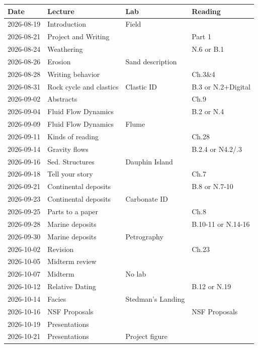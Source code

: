 \documentclass[11pt,]{article}
\begin{document}
\newpage

\begin{table}[!h]
\centering
\begin{tabular}{l>{\raggedright\arraybackslash}p{4cm}>{\raggedright\arraybackslash}p{4cm}>{\raggedright\arraybackslash}p{4cm}}
\toprule
Date & Lecture & Lab & Reading\\
\midrule
2026-08-19 & Introduction & Field & \\
2026-08-21 & Project and Writing &  & Part 1\\
2026-08-24 & Weathering &  & N.6 or B.1\\
2026-08-26 & Erosion & Sand description & \\
2026-08-28 & Writing behavior &  & Ch.3\&4\\
2026-08-31 & Rock cycle and clastics & Clastic ID & B.3 or N.2+Digital\\
2026-09-02 & Abstracts &  & Ch.9\\
2026-09-04 & Fluid Flow Dynamics &  & B.2 or N.4\\
2026-09-09 & Fluid Flow Dynamics & Flume & \\
2026-09-11 & Kinds of reading &  & Ch.28\\
2026-09-14 & Gravity flows &  & B.2.4 or N4.2/.3\\
2026-09-16 & Sed. Structures & Dauphin Island & \\
2026-09-18 & Tell your story &  & Ch.7\\
2026-09-21 & Continental deposits &  & B.8 or N.7-10\\
2026-09-23 & Continental deposits & Carbonate ID & \\
2026-09-25 & Parts to a paper &  & Ch.8\\
2026-09-28 & Marine deposits &  & B.10-11 or N.14-16\\
2026-09-30 & Marine deposits & Petrography & \\
2026-10-02 & Revision &  & Ch.23\\
2026-10-05 & Midterm review &  & \\
2026-10-07 & Midterm & No lab & \\
2026-10-12 & Relative Dating &  & B.12 or N.19\\
2026-10-14 & Facies & Stedman's Landing & \\
2026-10-16 & NSF Proposals &  & NSF Proposals\\
2026-10-19 & Presentations &  & \\
2026-10-21 & Presentations & Project figure & \\

\end{tabular}
\end{table}
\end{document}

